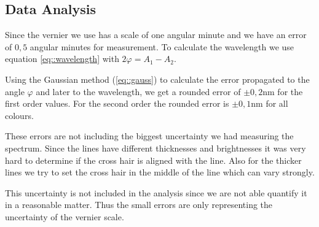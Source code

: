 \subsection{Data Analysis}

Since the vernier we use has a scale of one angular minute and we have an error of $0,5$ angular minutes for measurement.
To calculate the wavelength we use equation \ref{eq::wavelength} with $2\varphi = A_1-A_2$. 


Using the Gaussian method (\ref{eq::gauss}) to calculate the error propagated to the angle $\varphi$ and later to the wavelength, we get a rounded error of $\pm0,2$\si{\nano\m} for the first order values. 
For the second order the rounded error is $\pm0,1$\si{\nano\m} for all colours.

These errors are not including the biggest uncertainty we had measuring the spectrum. 
Since the lines have different thicknesses and brightnesses it was very hard to determine if the cross hair is aligned with the line.
Also for the thicker lines we try to set the cross hair in the middle of the line which can vary strongly.

This uncertainty is not included in the analysis since we are not able quantify it in a reasonable matter. Thus the small errors are only representing the uncertainty of the vernier scale.